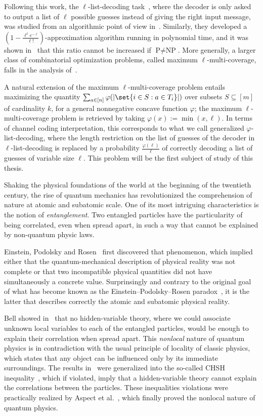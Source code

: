 Following this work, the $\ell$-list-decoding task~\cite{Elias57,Wozencraft58}, where the decoder is only asked to output a list of $\ell$ possible guesses instead of giving the right input message, was studied from an algorithmic point of view in~\cite{BFGG20}. Similarly, they developed a $\left(1-\frac{\ell^{\ell}e^{-\ell}}{\ell!}\right)$-approximation algorithm running in polynomial time, and it was shown in~\cite{DMMS20} that this ratio cannot be increased if $\textrm{P}\not=\textrm{NP}$. More generally, a larger class of combinatorial optimization problems, called maximum $\ell$-multi-coverage, falls in the analysis of~\cite{BFGG20}.

A natural extension of the maximum $\ell$-multi-coverage problem entails maximizing the quantity $\sum_{a \in [n]}  \varphi(\abs{\set{i \in S : a \in T_i}})$ over subsets $S \subseteq [m]$ of cardinality $k$, for a general nonnegative concave function $\varphi$; the  maximum $\ell$-multi-coverage problem is retrieved by taking $\varphi(x) := \min(x,\ell)$. In terms of channel coding interpretation, this corresponds to what we call generalized $\varphi$-list-decoding, where the length restriction on the list of guesses of the decoder in $\ell$-list-decoding is replaced by a probability $\frac{\varphi(\ell)}{\ell}$ of correctly decoding a list of guesses of variable size $\ell$. This problem will be the first subject of study of this thesis.

Shaking the physical foundations of the world at the beginning of the twentieth century, the rise of quantum mechanics has revolutionized the comprehension of nature at atomic and subatomic scale. One of its most intriguing characteristics is the notion of \emph{entanglement}. Two entangled particles have the particularity of being correlated, even when spread apart, in such a way that cannot be explained by non-quantum physic laws.

Einstein, Podolsky and Rosen~\cite{EPR35} first discovered that phenomenon, which implied either that the quantum-mechanical description of physical reality was not complete or that two incompatible physical quantities did not have simultaneously a concrete value. Surprinsingly and contrary to the original goal of what has become known as the Einstein–Podolsky–Rosen paradox~\cite{EPR35}, it is the latter that describes correctly the atomic and subatomic physical reality.

Bell showed in~\cite{Bell64} that no hidden-variable theory, where we could associate unknown local variables to each of the entangled particles, would be enough to explain their correlation when spread apart. This \emph{nonlocal} nature of quantum physics is in contradiction with the usual principle of locality of classic physics, which states that any object can be influenced only by its immediate surroundings. The results in~\cite{Bell64} were generalized into the so-called CHSH inequality~\cite{CHSH69}, which if violated, imply that a hidden-variable theory cannot explain the correlations between the particles. These inequalities violations were practically realized by Aspect et al.~\cite{ADG82}, which finally proved the nonlocal nature of quantum physics.

